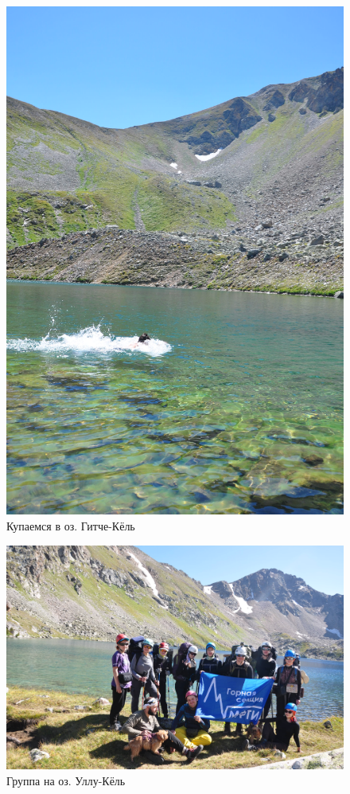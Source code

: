 \begin{figure}[h]
	\centering
	\begin{turn}{90}
		\includegraphics[width=0.7\linewidth]{../pics/DSC_0774}
	\end{turn}
	\caption{Купаемся в оз. Гитче-Кёль}
	\label{fig:DSC_0774}
\end{figure}

\begin{figure}[h]
	\centering
	\includegraphics[width=0.7\linewidth]{../pics/DSC_0800}
	\caption{Группа на оз. Уллу-Кёль}
	\label{fig:DSC_0800}
\end{figure}

\newpage